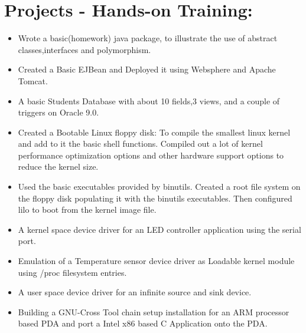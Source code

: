 \section {Projects - Hands-on Training:}
	\begin{itemize}
		\item Wrote a basic(homework) java package, to illustrate the use of abstract classes,interfaces and polymorphism.

		\item Created a Basic EJBean and Deployed it using Websphere and Apache Tomcat.

	 	\item A basic Students Database with about 10 fields,3 views, and a couple of triggers on Oracle 9.0.

	 	\item Created a Bootable Linux floppy disk: To compile the smallest linux kernel and add to it the basic shell functions. Compiled out a lot of kernel performance optimization options and other hardware support options to reduce the kernel size.

		\item Used the basic executables provided by binutils. Created a root file system on the floppy disk populating it with the binutils executables. Then configured lilo to boot from the kernel image file.

	  	\item A kernel space device driver for an LED controller application using the serial port.

		\item Emulation of a Temperature sensor device driver as Loadable kernel module using /proc filesystem entries.

	 	\item A user space device driver for an infinite source and sink device.

		\item Building a GNU-Cross Tool chain setup installation for an ARM processor based PDA and port a Intel x86 based C Application onto the PDA.
	\end{itemize}
